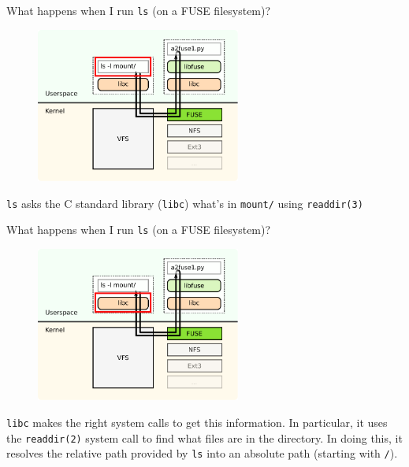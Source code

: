 \documentclass[notes]{beamer}
\begin{document}
\begin{frame}{What happens when I run \texttt{ls} (on a FUSE filesystem)?}
    \begin{figure}
        \centering
        \includegraphics[width=0.6\textwidth]{FUSE_structure_ls.pdf}
    \end{figure}
    \texttt{ls} asks the C standard library (\texttt{libc}) what's in \texttt{mount/} using \texttt{readdir(3)}
\end{frame}
\begin{frame}{What happens when I run \texttt{ls} (on a FUSE filesystem)?}
    \begin{figure}
        \centering
        \includegraphics[width=0.6\textwidth]{FUSE_structure_libc_1.pdf}
    \end{figure}
    \texttt{libc} makes the right system calls to get this information. In particular, it uses the \texttt{readdir(2)} system call to find what files are in the directory. In doing this, it resolves the relative path provided by \texttt{ls} into an absolute path (starting with \texttt{/}).
\end{frame}
\end{document}
